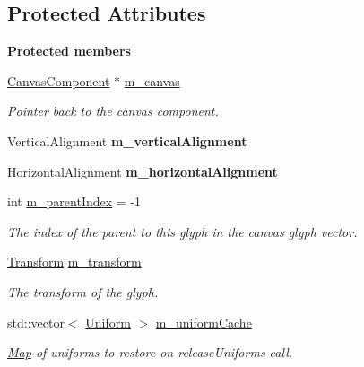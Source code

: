 \subsection*{Protected Attributes}
\begin{Indent}\textbf{ Protected members}\par
\begin{DoxyCompactItemize}
\item 
\mbox{\label{classrev_1_1_glyph_ab48116ae62f65ea1dc4bb1950f3a3cec}} 
\mbox{\hyperlink{classrev_1_1_canvas_component}{Canvas\+Component}} $\ast$ \mbox{\hyperlink{classrev_1_1_glyph_ab48116ae62f65ea1dc4bb1950f3a3cec}{m\+\_\+canvas}}
\begin{DoxyCompactList}\small\item\em Pointer back to the canvas component. \end{DoxyCompactList}\item 
\mbox{\label{classrev_1_1_glyph_a3b1320c55f744f766e14d6ab3847f38b}} 
Vertical\+Alignment {\bfseries m\+\_\+vertical\+Alignment}
\item 
\mbox{\label{classrev_1_1_glyph_a72cfb8c5b7dc589d6c304a5c8f8e52a3}} 
Horizontal\+Alignment {\bfseries m\+\_\+horizontal\+Alignment}
\item 
int \mbox{\hyperlink{classrev_1_1_glyph_a2c8214da501a742bea70dde66098922a}{m\+\_\+parent\+Index}} = -\/1
\begin{DoxyCompactList}\small\item\em The index of the parent to this glyph in the canvas glyph vector. \end{DoxyCompactList}\item 
\mbox{\label{classrev_1_1_glyph_a46597825ea20fe6a100c07404ec64041}} 
\mbox{\hyperlink{classrev_1_1_transform}{Transform}} \mbox{\hyperlink{classrev_1_1_glyph_a46597825ea20fe6a100c07404ec64041}{m\+\_\+transform}}
\begin{DoxyCompactList}\small\item\em The transform of the glyph. \end{DoxyCompactList}\item 
\mbox{\label{classrev_1_1_glyph_a96d8001b329f610d466ec6981b3e91f3}} 
std\+::vector$<$ \mbox{\hyperlink{structrev_1_1_uniform}{Uniform}} $>$ \mbox{\hyperlink{classrev_1_1_glyph_a96d8001b329f610d466ec6981b3e91f3}{m\+\_\+uniform\+Cache}}
\begin{DoxyCompactList}\small\item\em \mbox{\hyperlink{classrev_1_1_map}{Map}} of uniforms to restore on release\+Uniforms call. \end{DoxyCompactList}\end{DoxyCompactItemize}
\end{Indent}
